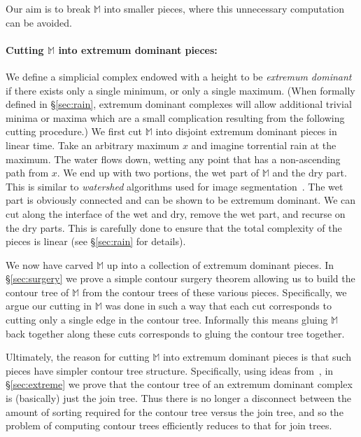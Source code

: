 \documentclass[11pt]{article}
\newcommand{\myparagraph}[1]{\paragraph{#1}}
\theoremstyle{definition}
\newcommand{\MM}{\mathbb{M}}
\newcommand{\Sec}[1]{\hyperref[sec:#1]{\S\ref*{sec:#1}}} %
\begin{document}
Our aim is to break $\MM$ into smaller pieces, where this unnecessary computation can be avoided.

 
\myparagraph{Cutting $\MM$ into extremum dominant pieces:} We define a simplicial complex
endowed with a height to be \emph{extremum dominant} if there exists only a single minimum, or only a single maximum.
(When formally defined in \Sec{rain}, extremum dominant complexes will allow additional trivial minima or maxima which are a small complication resulting from the following cutting procedure.)
We first cut $\MM$ into disjoint extremum dominant pieces in linear time.
Take an arbitrary maximum $x$ and imagine torrential rain at the maximum. The water flows down, wetting any point that has a non-ascending path 
from $x$. We end up with two portions, the wet part of $\MM$ and the dry part. This is similar
to \emph{watershed} algorithms used for image segmentation~\cite{RoMe00}. The wet part is obviously connected and
can be shown to be extremum dominant. We can cut along the interface of the wet and dry, remove
the wet part, and recurse on the dry parts. This is carefully done to ensure that the total complexity
of the pieces is linear (see \Sec{rain} for details).
% 
% 

We now have carved $\MM$ up into a collection of extremum dominant pieces. 
In \Sec{surgery} we prove a simple contour surgery theorem allowing us to build the contour tree of $\MM$
from the contour trees of these various pieces.  Specifically, we argue our cutting in $\MM$ was done in such a way that 
each cut corresponds to cutting only a single edge in the contour tree.  Informally this means gluing $\MM$ back together along these 
cuts corresponds to gluing the contour tree together.

Ultimately, the reason for cutting $\MM$ into extremum dominant pieces is that such pieces have simpler contour tree structure. 
Specifically, using ideas from~\cite{csa-cctad-03}, in \Sec{extreme} we prove that the contour tree of an extremum dominant complex is (basically) just the join tree. 
Thus there is no longer a disconnect between the amount of sorting required for the contour tree versus the join tree, 
and so the problem of computing contour trees efficiently reduces to that for join trees.
\end{document}
